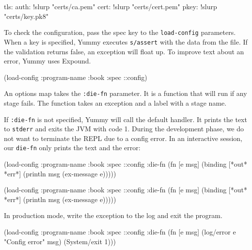 \begin{yaml}
tls:
  auth: !slurp "certs/ca.pem"
  cert: !slurp "certs/cert.pem"
  pkey: !slurp "certs/key.pk8"
\end{yaml}


To check the configuration, pass the spec key to the \verb|load-config| parameters. When a key is specified, Yummy executes \verb|s/assert| with the data from the file. If the validation returns false, an exception will float up. To improve text about an error, Yummy uses Expound.

\begin{clojure}
(load-config {:program-name :book
              :spec ::config})
\end{clojure}


An options map takes the \verb|:die-fn| parameter. It is a function that will run if any stage fails. The function takes an exception and a label with a stage name.


If \verb|:die-fn| is not specified, Yummy will call the default handler. It prints the text to \verb|stderr| and exits the JVM with code 1. During the development phase, we do not want to terminate the REPL due to a config error. In an interactive session, our \verb|die-fn| only prints the text and the error:

\ifnarrow

\begin{clojure}
(load-config
 {:program-name :book
  :spec ::config
  :die-fn (fn [e msg]
            (binding [*out* *err*]
              (println msg
                (ex-message e))))})
\end{clojure}

\else

\begin{clojure}
(load-config
 {:program-name :book
  :spec ::config
  :die-fn (fn [e msg]
            (binding [*out* *err*]
              (println msg (ex-message e))))})
\end{clojure}

\fi

\noindent
In production mode, write the exception to the log and exit the program.


\ifnarrow

\begin{clojure}
(load-config
 {:program-name :book
  :spec ::config
  :die-fn (fn [e msg]
            (log/error e
              "Config error" msg)
            (System/exit 1))})
\end{clojure}

